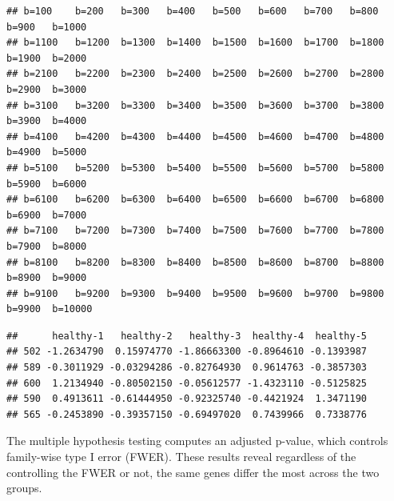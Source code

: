 \documentclass[]{article}
\newenvironment{Shaded}{\begin{snugshade}}{\end{snugshade}}
\newcommand{\DecValTok}[1]{\textcolor[rgb]{0.00,0.00,0.81}{{#1}}}
\newcommand{\StringTok}[1]{\textcolor[rgb]{0.31,0.60,0.02}{{#1}}}
\newcommand{\NormalTok}[1]{{#1}}
\begin{document}
\begin{verbatim}
## b=100    b=200   b=300   b=400   b=500   b=600   b=700   b=800   b=900   b=1000  
## b=1100   b=1200  b=1300  b=1400  b=1500  b=1600  b=1700  b=1800  b=1900  b=2000  
## b=2100   b=2200  b=2300  b=2400  b=2500  b=2600  b=2700  b=2800  b=2900  b=3000  
## b=3100   b=3200  b=3300  b=3400  b=3500  b=3600  b=3700  b=3800  b=3900  b=4000  
## b=4100   b=4200  b=4300  b=4400  b=4500  b=4600  b=4700  b=4800  b=4900  b=5000  
## b=5100   b=5200  b=5300  b=5400  b=5500  b=5600  b=5700  b=5800  b=5900  b=6000  
## b=6100   b=6200  b=6300  b=6400  b=6500  b=6600  b=6700  b=6800  b=6900  b=7000  
## b=7100   b=7200  b=7300  b=7400  b=7500  b=7600  b=7700  b=7800  b=7900  b=8000  
## b=8100   b=8200  b=8300  b=8400  b=8500  b=8600  b=8700  b=8800  b=8900  b=9000  
## b=9100   b=9200  b=9300  b=9400  b=9500  b=9600  b=9700  b=9800  b=9900  b=10000 
\end{verbatim}

\begin{Shaded}
\end{Shaded}

\begin{verbatim}
##      healthy-1   healthy-2   healthy-3  healthy-4  healthy-5
## 502 -1.2634790  0.15974770 -1.86663300 -0.8964610 -0.1393987
## 589 -0.3011929 -0.03294286 -0.82764930  0.9614763 -0.3857303
## 600  1.2134940 -0.80502150 -0.05612577 -1.4323110 -0.5125825
## 590  0.4913611 -0.61444950 -0.92325740 -0.4421924  1.3471190
## 565 -0.2453890 -0.39357150 -0.69497020  0.7439966  0.7338776
\end{verbatim}

The multiple hypothesis testing computes an adjusted p-value, which
controls family-wise type I error (FWER). These results reveal
regardless of the controlling the FWER or not, the same genes differ the
most across the two groups.
\end{document}

